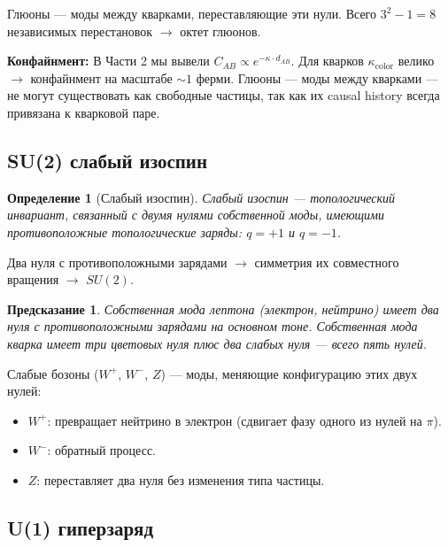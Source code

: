 \documentclass[12pt,a4paper]{article}
\newtheorem{definition}{Определение}[section]
\newtheorem{prediction}{Предсказание}[section]
\begin{document}
Глюоны — моды между кварками, переставляющие эти нули. Всего $3^2 - 1 = 8$ независимых перестановок $\to$ октет глюонов.

\textbf{Конфайнмент:} В Части 2 мы вывели $C_{AB} \propto e^{-\kappa \cdot d_{AB}}$. Для кварков $\kappa_{\text{color}}$ велико $\to$ конфайнмент на масштабе $\sim 1$ ферми. Глюоны — моды между кварками — не могут существовать как свободные частицы, так как их causal history всегда привязана к кварковой паре.

\subsection{SU(2) слабый изоспин}

\begin{definition}[Слабый изоспин]
Слабый изоспин — топологический инвариант, связанный с двумя нулями собственной моды, имеющими противоположные топологические заряды: $q = +1$ и $q = -1$.
\end{definition}

Два нуля с противоположными зарядами $\to$ симметрия их совместного вращения $\to$ $SU(2)$.

\begin{prediction}
Собственная мода лептона (электрон, нейтрино) имеет два нуля с противоположными зарядами на основном тоне. Собственная мода кварка имеет три цветовых нуля плюс два слабых нуля — всего пять нулей.
\end{prediction}

Слабые бозоны ($W^+$, $W^-$, $Z$) — моды, меняющие конфигурацию этих двух нулей:
\begin{itemize}
    \item $W^+$: превращает нейтрино в электрон (сдвигает фазу одного из нулей на $\pi$).
    \item $W^-$: обратный процесс.
    \item $Z$: переставляет два нуля без изменения типа частицы.
\end{itemize}

\subsection{U(1) гиперзаряд}
\end{document}
